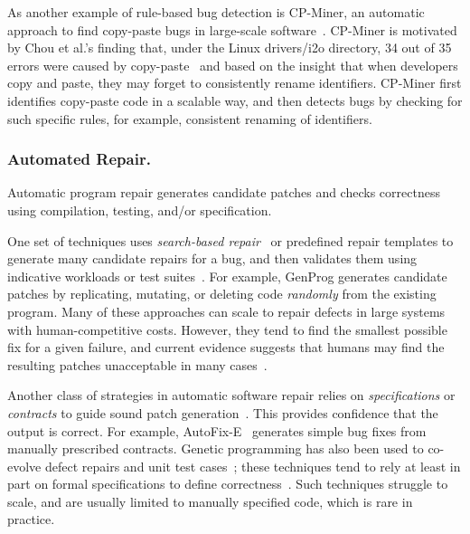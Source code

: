 As another example of rule-based bug detection is CP-Miner, an automatic approach to find copy-paste bugs in large-scale software~\cite{Li2006:CPMiner}. CP-Miner is motivated by Chou et al.'s finding that, under the Linux {\sf drivers/i2o} directory, 34 out of 35 errors were caused by copy-paste~\cite{Chou2001:ESO} and based on the insight that when developers copy and paste, they may forget to consistently rename identifiers. CP-Miner first identifies copy-paste code in a scalable way, and then detects bugs by checking for such specific rules, for example, consistent renaming of identifiers. %
\subsubsection{Automated Repair.} 
Automatic program repair generates candidate patches and checks correctness using compilation, testing, and/or specification. 

One set of techniques uses {\em search-based repair}~\cite{harman07} or predefined repair templates to generate many candidate repairs for a bug, and then validates them using indicative workloads or test suites~\cite{Kim2013:PAR, genprog-icse2012, Perkins09:clearview}. For example, GenProg generates candidate patches by replicating, mutating, or deleting code \emph{randomly} from the existing program. Many of these approaches can scale to repair defects in large systems with human-competitive costs. However, they tend to find the smallest possible fix for a given failure, and current evidence suggests that humans may find the resulting patches unacceptable in many cases~\cite{genprog-maintainability,Kim2013:PAR}. 

Another class of strategies in automatic software repair relies on {\em specifications} or {\em contracts} to guide sound patch generation~\cite{gopinath2011, liblit2011, liu2012, semfix13,Wei:2010:AutoFix-E}. This provides confidence that the output is correct. For example, AutoFix-E~\cite{Wei:2010:AutoFix-E} generates simple bug fixes from manually prescribed contracts. Genetic programming has also been used to co-evolve defect repairs and unit test cases~\cite{Arcuri11,wilkerson2012}; these techniques tend to rely at least in part on formal specifications to define correctness~\cite{arcuriy08,wilkerson11}.  Such techniques struggle to scale, and are usually limited to manually specified code, which is rare in practice.

